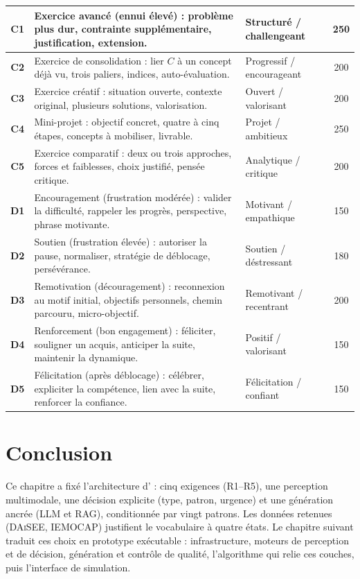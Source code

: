 {\begin{xltabular}{\textwidth}{|>{\bfseries}c|>{\raggedright\arraybackslash}X|>{\raggedright\arraybackslash}p{2.35cm}|c|}
\hline
C1 & Exercice avancé (ennui élevé) :
problème plus dur, contrainte supplémentaire, 
justification, extension. & Structuré / challengeant & 250 \\
\hline
C2 & Exercice de consolidation :
lier $C$ à un concept déjà vu, trois paliers, 
indices, auto-évaluation. & Progressif / encourageant & 200 \\
\hline
C3 & Exercice créatif :
situation ouverte, contexte original, 
plusieurs solutions, valorisation. & Ouvert / valorisant & 200 \\
\hline
C4 & Mini-projet :
objectif concret, quatre à cinq étapes, 
concepts à mobiliser, livrable. & Projet / ambitieux & 250 \\
\hline
C5 & Exercice comparatif :
deux ou trois approches, forces et faiblesses, 
choix justifié, pensée critique. & Analytique / critique & 200 \\
\hline
D1 & Encouragement (frustration modérée) :
valider la difficulté, rappeler les progrès, 
perspective, phrase motivante. & Motivant / empathique & 150 \\
\hline
D2 & Soutien (frustration élevée) :
autoriser la pause, normaliser, 
stratégie de déblocage, persévérance. & Soutien / déstressant & 180 \\
\hline
D3 & Remotivation (découragement) :
reconnexion au motif initial, objectifs personnels, 
chemin parcouru, micro-objectif. & Remotivant / recentrant & 200 \\
\hline
D4 & Renforcement (bon engagement) :
féliciter, souligner un acquis, 
anticiper la suite, maintenir la dynamique. & Positif / valorisant & 150 \\
\hline
D5 & Félicitation (après déblocage) :
célébrer, expliciter la compétence, 
lien avec la suite, renforcer la confiance. & Félicitation / confiant & 150 \\
\hline
\end{xltabular}
\label{tab:templates}
\label{tab:templates-meta}
}

\section{Conclusion}
\label{sec:ch3-concl}

Ce chapitre a fixé l'architecture d'\emolearn{} : cinq exigences
(R1--R5), une perception multimodale, une décision explicite (type,
patron, urgence) et une génération ancrée (LLM et RAG), conditionnée
par vingt patrons. Les données retenues (\textsc{DAiSEE},
\textsc{IEMOCAP}) justifient le vocabulaire à quatre états.
Le chapitre suivant traduit ces choix en prototype exécutable :
infrastructure, moteurs de perception et de décision, génération et
contrôle de qualité, l'algorithme qui relie ces couches, puis
l'interface de simulation.
